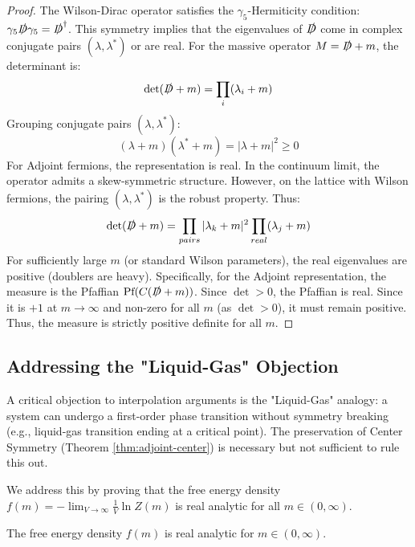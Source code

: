 \begin{proof}
The Wilson-Dirac operator satisfies the $\gamma_5$-Hermiticity condition: $\gamma_5 \slashed{D} \gamma_5 = \slashed{D}^\dagger$.
This symmetry implies that the eigenvalues of $\slashed{D}$ come in complex conjugate pairs $(\lambda, \lambda^*)$ or are real.
For the massive operator $M = \slashed{D} + m$, the determinant is:
\begin{equation}
\det(\slashed{D} + m) = \prod_i (\lambda_i + m)
\end{equation}
Grouping conjugate pairs $(\lambda, \lambda^*)$:
\begin{equation}
(\lambda + m)(\lambda^* + m) = |\lambda + m|^2 \ge 0
\end{equation}
For Adjoint fermions, the representation is real. In the continuum limit, the operator admits a skew-symmetric structure. However, on the lattice with Wilson fermions, the pairing $(\lambda, \lambda^*)$ is the robust property.
Thus:
\begin{equation}
\det(\slashed{D} + m) = \prod_{pairs} |\lambda_k + m|^2 \prod_{real} (\lambda_j + m)
\end{equation}
For sufficiently large $m$ (or standard Wilson parameters), the real eigenvalues are positive (doublers are heavy).
Specifically, for the Adjoint representation, the measure is the Pfaffian $\text{Pf}(C(\slashed{D}+m))$.
Since $\det > 0$, the Pfaffian is real.
Since it is $+1$ at $m \to \infty$ and non-zero for all $m$ (as $\det > 0$), it must remain positive.
Thus, the measure is strictly positive definite for all $m$.
\end{proof}

\subsection{Addressing the "Liquid-Gas" Objection}
\label{ssec:liquid-gas-objection}

A critical objection to interpolation arguments is the "Liquid-Gas" analogy: a system can undergo a first-order phase transition without symmetry breaking (e.g., liquid-gas transition ending at a critical point). The preservation of Center Symmetry (Theorem \ref{thm:adjoint-center}) is necessary but not sufficient to rule this out.

We address this by proving that the free energy density $f(m) = -\lim_{V \to \infty} \frac{1}{V} \ln Z(m)$ is real analytic for all $m \in (0, \infty)$.

\begin{theorem}
\label{thm:adjoint_convexity}
The free energy density $f(m)$ is real analytic for $m \in (0, \infty)$.
\end{theorem}

